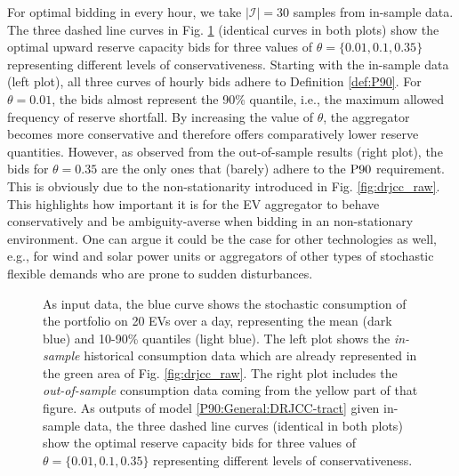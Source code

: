 \documentclass[conference]{IEEEtran}
\begin{document}
For optimal bidding in every hour, we take $|\mathcal{I}| = 30$ samples from  in-sample data. The three dashed line curves in Fig. \ref{fig:drjcc_bids} (identical curves in both plots) show the optimal upward reserve capacity bids for  three values of $\theta = \{0.01, 0.1, 0.35\}$ representing different levels of conservativeness. 
Starting with the in-sample data (left plot), all three curves of hourly bids adhere to Definition \ref{def:P90}. For $\theta = 0.01$, the bids almost represent the 90\% quantile, i.e., the maximum allowed frequency of reserve shortfall. By increasing the value of $\theta$, the aggregator becomes more conservative and therefore offers comparatively lower reserve quantities. However, as observed from the out-of-sample results (right plot), the bids for $\theta = 0.35$ are the only ones that (barely) adhere to the $\rm{P90}$ requirement. This is obviously due to the non-stationarity introduced in Fig. \ref{fig:drjcc_raw}. This highlights how important it is for the EV aggregator to behave conservatively and be ambiguity-averse when bidding in an non-stationary environment. One can argue it could be the case  
for other technologies as well, e.g., for wind and solar power units or aggregators of other types of stochastic flexible demands who are prone to sudden disturbances. 


\begin{figure}[!t]
    \centering
    \begin{adjustbox}{width=\columnwidth}
        
    \end{adjustbox}
    \caption{\small{ As input data, the blue curve shows the stochastic consumption of the portfolio on 20 EVs over a day, representing the mean (dark blue) and 10-90\% quantiles (light blue). The left plot shows the \textit{in-sample} historical consumption data which are already represented in the green area of Fig. \ref{fig:drjcc_raw}. The right plot includes the \textit{out-of-sample} consumption data coming from the yellow part of that figure. As outputs of model \eqref{P90:General:DRJCC-tract} given in-sample data, the three dashed line curves (identical in both plots) show the optimal  reserve capacity bids for three values of $\theta = \{0.01, 0.1, 0.35\}$ representing different levels of conservativeness.}}
    \label{fig:drjcc_bids}
\end{figure}
\end{document}
